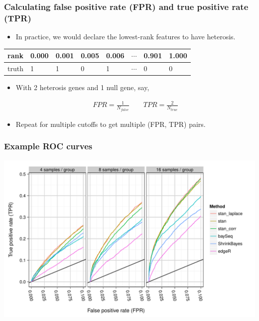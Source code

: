 \documentclass[handout]{beamer}
\numberwithin{equation}{section}
\begin{document}
\begin{frame}
\frametitle{Calculating false positive rate (FPR) and true positive rate (TPR)}

\begin{itemize}
\pause \item In practice, we would declare the lowest-rank features to have heterosis.
\end{itemize}

\pause \begin{tabular}{l|l|l|l|l|l|l|l}
rank & {\color{blue} 0.000} & {\color{blue}0.001} & {\color{blue}0.005} & 0.006 & $\cdots$ & 0.901 & 1.000  \\ \hline
truth & {\color{blue}1} & {\color{blue}1} & {\color{blue}0} & 1 & $\cdots$ & 0 & 0
\end{tabular}

\begin{itemize}
\pause \item With 2 heterosis genes and 1 null gene, say,

\begin{align*}
FPR = \frac{1}{N_{false}} \qquad TPR = \frac{2}{N_{true}}
\end{align*}

\pause \item Repeat for multiple cutoffs to get multiple (FPR, TPR) pairs.
\end{itemize}
\end{frame}


\begin{frame}
\frametitle{Example ROC curves}
\begin{center}
\includegraphics[scale=0.5]{roc}
\end{center}
\end{frame}
\end{document}
